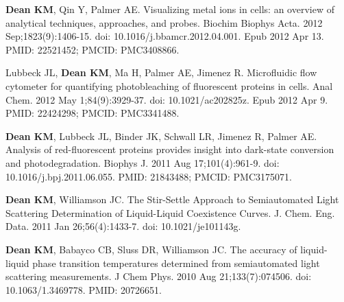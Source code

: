 \begin{etaremune}
\item \textbf{Dean KM}, Qin Y, Palmer AE. Visualizing metal ions in cells: an overview of analytical techniques, approaches, and probes. Biochim Biophys Acta. 2012 Sep;1823(9):1406-15. doi: 10.1016/j.bbamcr.2012.04.001. Epub 2012 Apr 13. PMID: 22521452; PMCID: PMC3408866.

\item Lubbeck JL, \textbf{Dean KM}, Ma H, Palmer AE, Jimenez R. Microfluidic flow cytometer for quantifying photobleaching of fluorescent proteins in cells. Anal Chem. 2012 May 1;84(9):3929-37. doi: 10.1021/ac202825z. Epub 2012 Apr 9. PMID: 22424298; PMCID: PMC3341488.

\item \textbf{Dean KM}, Lubbeck JL, Binder JK, Schwall LR, Jimenez R, Palmer AE. Analysis of red-fluorescent proteins provides insight into dark-state conversion and photodegradation. Biophys J. 2011 Aug 17;101(4):961-9. doi: 10.1016/j.bpj.2011.06.055. PMID: 21843488; PMCID: PMC3175071.

\item \textbf{Dean KM}, Williamson JC. The Stir-Settle Approach to Semiautomated Light Scattering Determination of Liquid-Liquid Coexistence Curves.  J. Chem. Eng. Data.  2011 Jan 26;56(4):1433-7. doi: 10.1021/je101143g.

\item \textbf{Dean KM}, Babayco CB, Sluss DR, Williamson JC. The accuracy of liquid-liquid phase transition temperatures determined from semiautomated light scattering measurements. J Chem Phys. 2010 Aug 21;133(7):074506. doi: 10.1063/1.3469778. PMID: 20726651.

\end{etaremune}
